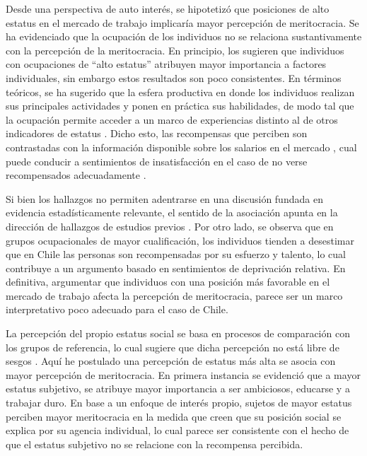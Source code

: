 \documentclass[12pt]{article}
\begin{document}
Desde una perspectiva de auto interés, se hipotetizó que posiciones de alto estatus en el mercado de trabajo implicaría mayor percepción de meritocracia. Se ha evidenciado que la ocupación de los individuos no se relaciona sustantivamente con la percepción de la meritocracia. En principio, los sugieren que individuos con ocupaciones de ``alto estatus'' atribuyen mayor importancia a factores individuales, sin embargo estos resultados son poco consistentes. En términos teóricos, se ha sugerido que la esfera productiva en donde los individuos realizan sus principales actividades y ponen en práctica sus habilidades, de modo tal que la ocupación permite acceder a un marco de experiencias distinto al de otros indicadores de estatus \citep{Svallfors2006}. Dicho esto, las recompensas que perciben son contrastadas con la información disponible sobre los salarios en el mercado \citep{Kulin2013}, cual puede conducir a sentimientos de insatisfacción en el caso de no verse recompensados adecuadamente \citep{Adams1965}. 

Si bien los hallazgos no permiten adentrarse en una discusión fundada en evidencia estadísticamente relevante, el sentido de la asociación apunta en la dirección de hallazgos de estudios previos \citep{Sandoval2017}. Por otro lado, se observa que en grupos ocupacionales de mayor cualificación, los individuos tienden a desestimar que en Chile las personas son recompensadas por su esfuerzo y talento, lo cual contribuye a un argumento basado en sentimientos de deprivación relativa. En definitiva, argumentar que individuos con una posición más favorable en el mercado de trabajo afecta la percepción de meritocracia, parece ser un marco interpretativo poco adecuado para el caso de Chile.



La percepción del propio estatus social se basa en procesos de comparación con los grupos de referencia, lo cual sugiere que dicha percepción no está libre de sesgos \citep{Evans2004,Castillo2013,Lindemann2014}. Aquí he postulado una percepción de estatus más alta se asocia con mayor percepción de meritocracia. En primera instancia se evidenció que a mayor estatus subjetivo, se atribuye mayor importancia a ser ambiciosos, educarse y a trabajar duro. En base a un enfoque de interés propio, sujetos de mayor estatus perciben mayor meritocracia en la medida que creen que su posición social se explica por su agencia individual, lo cual parece ser consistente con el hecho de que el estatus subjetivo no se relacione con la recompensa percibida.   
\end{document}
